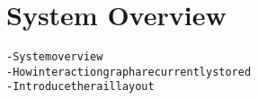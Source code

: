 \section{System Overview}\label{sec:system}
\begin{alltt}\scriptsize
- System overview
    - How interaction graph are currently stored
    - Introduce the rail layout
\end{alltt}
